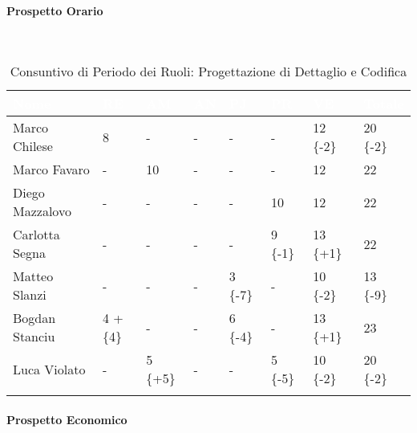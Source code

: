 \paragraph{Prospetto Orario } ~\\
\begin{longtable}{|C{.30\textwidth}|C{.06\textwidth}|C{.06\textwidth}|C{.06\textwidth} | C{.06\textwidth}| C{.06\textwidth} | C{.06\textwidth} | C{.10\textwidth} |}
	\hline
		\textbf{\textcolor{white}{Nome}} & \textbf{\textcolor{white}{RE}} & \textbf{\textcolor{white}{AM}} & \textbf{\textcolor{white}{AN}} & \textbf{\textcolor{white}{PJ}} & \textbf{\textcolor{white}{PR}} & \textbf{\textcolor{white}{VE}} & \textbf{\textcolor{white}{Totale}}\\
	\hline 
	Marco Chilese & 8 & - & - & - & - & 12 \{-2\}& 20 \{-2\} \\
	\hline
	Marco Favaro &  - & 10 & - & - & - & 12 & 22 \\
	\hline
	Diego Mazzalovo & - & -  & - & - & 10 & 12 & 22 \\
	\hline
	Carlotta Segna & - & -  & - & - & 9 \{-1\} & 13 \{+1\} & 22 \\
	\hline
	Matteo Slanzi & - & - & - & 3 \{-7\}  & - & 10 \{-2\} & 13 \{-9\}\\
	\hline
	Bogdan Stanciu & 4 +\{4\} & - & - & 6 \{-4\} &  - & 13 \{+1\} & 23 \\
	\hline
	Luca Violato & - & 5 \{+5\} & - & - & 5 \{-5\} & 10 \{-2\}  & 20 \{-2\}\\   
	\hline
	
	
	\caption{Consuntivo di Periodo dei Ruoli: Progettazione di Dettaglio e Codifica}
	\label{CP PRC}
\end{longtable}

\paragraph{Prospetto Economico} ~\\

